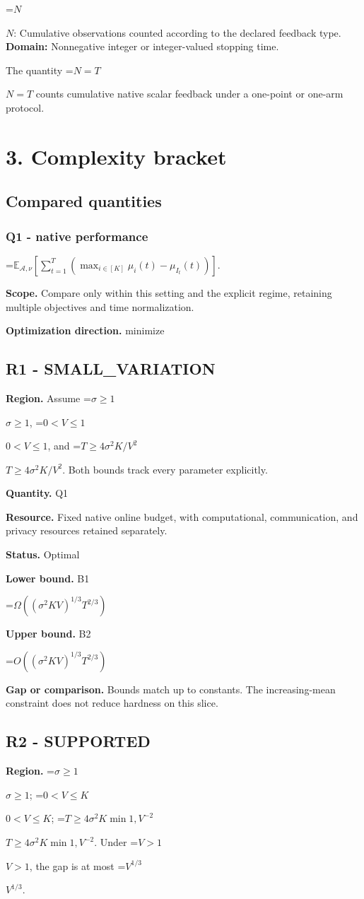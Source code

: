 \documentclass[10pt,a4paper]{article}
\newcommand{\AtlasMath}[1]{\par\begingroup\centering\setbox0=\hbox{$\displaystyle #1$}\ifdim\wd0>1.4\linewidth\typeout{ATLAS WIDE FORMULA: \the\wd0}\fi\ifdim\wd0>\linewidth\resizebox{\linewidth}{!}{\box0}\else\box0\fi\par\endgroup}
\newcommand{\AtlasInlineMath}[1]{\begingroup\setbox0=\hbox{$#1$}\ifdim\wd0>.4\linewidth\endgroup\AtlasMath{#1}\else\endgroup$#1$\fi}
\begin{document}
\AtlasInlineMath{N}: Cumulative observations counted according to the declared feedback type. \textbf{Domain:} Nonnegative integer or integer-valued stopping time.

The quantity \AtlasInlineMath{N=T} counts cumulative native scalar feedback under a one-point or one-arm protocol.

\section{3. Complexity bracket}
\subsection{Compared quantities}
\subsubsection{Q1 - native performance}
\AtlasMath{\mathbb E_{\mathcal A,\nu}\!\left[\sum_{t=1}^{T}\left(\max_{i\in[K]}\mu_i(t)-\mu_{I_t}(t)\right)\right].}
\textbf{Scope.} Compare only within this setting and the explicit regime, retaining multiple objectives and time normalization.

\textbf{Optimization direction.} minimize

\subsection{R1 - SMALL\_VARIATION}
\textbf{Region.} Assume \AtlasInlineMath{\sigma\ge1}, \AtlasInlineMath{0<V\le1}, and \AtlasInlineMath{T\ge4\sigma^2K/V^2}. Both bounds track every parameter explicitly.

\textbf{Quantity.} Q1

\textbf{Resource.} Fixed native online budget, with computational, communication, and privacy resources retained separately.

\textbf{Status.} Optimal

\textbf{Lower bound.} B1

\AtlasMath{\Omega((\sigma^2KV)^{1/3}T^{2/3})}
\textbf{Upper bound.} B2

\AtlasMath{O((\sigma^2KV)^{1/3}T^{2/3})}
\textbf{Gap or comparison.} Bounds match up to constants. The increasing-mean constraint does not reduce hardness on this slice.

\subsection{R2 - SUPPORTED}
\textbf{Region.} \AtlasInlineMath{\sigma\ge 1}; \AtlasInlineMath{0<V\le K}; \AtlasInlineMath{T\ge 4\sigma^{2}K \min{1,V}^{-2}}. Under \AtlasInlineMath{V>1}, the gap is at most \AtlasInlineMath{V^{1/3}}.
\end{document}
